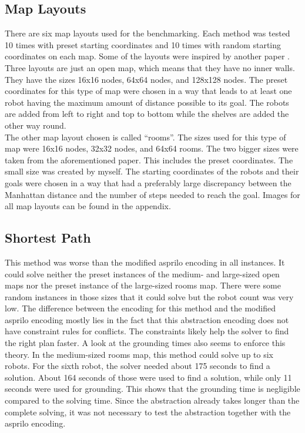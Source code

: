\documentclass[runningheads]{llncs}
\begin{document}
\subsection{Map Layouts}
There are six map layouts used for the benchmarking. Each method was tested 10 times with preset starting coordinates and 10 times with random starting coordinates on each map. Some of the layouts were inspired by another paper \cite{mapf}. Three layouts are just an open map, which means that they have no inner walls. They have the sizes 16x16 nodes, 64x64 nodes, and 128x128 nodes. The preset coordinates for this type of map were chosen in a way that leads to at least one robot having the maximum amount of distance possible to its goal. The robots are added from left to right and top to bottom while the shelves are added the other way round. \\
The other map layout chosen is called ``rooms''. The sizes used for this type of map were 16x16 nodes, 32x32 nodes, and 64x64 rooms. The two bigger sizes were taken from the aforementioned paper. This includes the preset coordinates. The small size was created by myself. The starting coordinates of the robots and their goals were chosen in a way that had a preferably large discrepancy between the Manhattan distance and the number of steps needed to reach the goal. Images for all map layouts can be found in the appendix.
\subsection{Shortest Path}
This method was worse than the modified asprilo encoding in all instances. It could solve neither the preset instances of the medium- and large-sized open maps nor the preset instance of the large-sized rooms map. There were some random instances in those sizes that it could solve but the robot count was very low. The difference between the encoding for this method and the modified asprilo encoding mostly lies in the fact that this abstraction encoding does not have constraint rules for conflicts. The constraints likely help the solver to find the right plan faster. A look at the grounding times also seems to enforce this theory. In the medium-sized rooms map, this method could solve up to six robots. For the sixth robot, the solver needed about 175 seconds to find a solution. About 164 seconds of those were used to find a solution, while only 11 seconds were used for grounding. This shows that the grounding time is negligible compared to the solving time. Since the abstraction already takes longer than the complete solving, it was not necessary to test the abstraction together with the asprilo encoding. 
\end{document}
